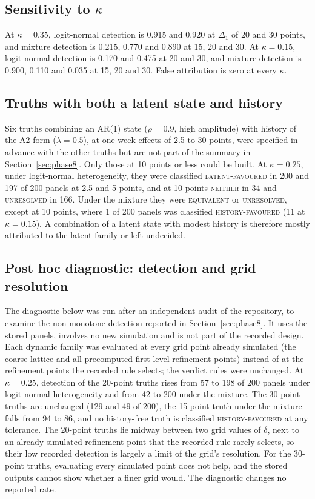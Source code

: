 \documentclass[11pt]{article}
\newcommand{\verdict}[1]{\textsc{#1}}
\begin{document}
\subsection{Sensitivity to \texorpdfstring{$\kappa$}{kappa}}
At $\kappa=0.35$, logit-normal detection is 0.915 and 0.920 at
$\Delta_1$ of 20 and 30 points, and mixture detection is 0.215, 0.770 and 0.890 at 15, 20 and 30. At
$\kappa=0.15$, logit-normal detection is 0.170 and 0.475 at 20 and 30, and mixture detection is 0.900,
0.110 and 0.035 at 15, 20 and 30. False attribution is zero at every $\kappa$.

\subsection{Truths with both a latent state and history}
Six truths combining an AR(1) state ($\rho=0.9$, high amplitude) with history of the A2 form
($\lambda=0.5$), at one-week effects of 2.5 to 30 points, were specified in advance with the other
truths but are not part of the summary in Section~\ref{sec:phase8}. Only those at 10 points or
less could be built. At $\kappa=0.25$, under logit-normal heterogeneity, they were classified
\verdict{latent-favoured} in 200 and 197 of 200 panels at 2.5 and 5 points, and at 10 points
\verdict{neither} in 34 and \verdict{unresolved} in 166. Under the mixture they were
\verdict{equivalent} or \verdict{unresolved}, except at 10 points, where 1 of 200 panels was
classified \verdict{history-favoured} (11 at $\kappa=0.15$). A combination of a latent state with
modest history is therefore mostly attributed to the latent family or left undecided.

\subsection{Post hoc diagnostic: detection and grid resolution}
The diagnostic below was run after an independent audit of the repository, to examine the
non-monotone detection reported in Section~\ref{sec:phase8}. It uses the stored panels, involves
no new simulation and is not part of the recorded design. Each dynamic family was evaluated at every grid point already
simulated (the coarse lattice and all precomputed first-level refinement points) instead of at
the refinement points the recorded rule selects; the verdict rules were unchanged. At
$\kappa=0.25$, detection of the 20-point truths rises from 57 to 198 of 200 panels under
logit-normal heterogeneity and from 42 to 200 under the mixture. The 30-point truths are unchanged
(129 and 49 of 200), the 15-point truth under the mixture falls from 94 to 86, and no history-free
truth is classified \verdict{history-favoured} at any tolerance. The 20-point truths lie midway
between two grid values of $\delta$, next to an already-simulated refinement point that the
recorded rule rarely selects, so their low recorded detection is largely a limit of the grid's
resolution. For the 30-point truths, evaluating every simulated point does not help, and the
stored outputs cannot show whether a finer grid would. The diagnostic changes no reported rate.
\end{document}
